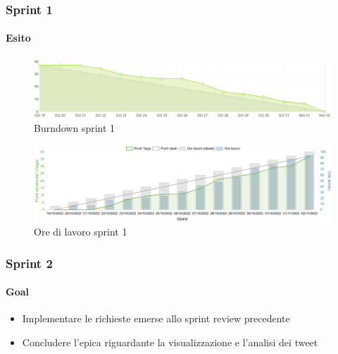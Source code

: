 \documentclass{beamer}
\begin{document}

\begin{frame}
  \frametitle{Sprint 1}
  \framesubtitle{Esito}
  \begin{figure}[H]
      \centering
      \includegraphics[width=\textwidth]{../img/sprint1/burndown.png}    
      \caption{Burndown sprint 1}
  \end{figure}
  \begin{figure}[H]
    \centering
    \includegraphics[width=\textwidth]{../img/sprint1/worktime.png}    
    \caption{Ore di lavoro sprint 1}
\end{figure}
\end{frame}


\begin{frame}
  \frametitle{Sprint 2}
  \framesubtitle{Goal}

  \begin{itemize}
    \item Implementare le richieste emerse allo sprint review precedente
    \item Concludere l'epica riguardante la visualizzazione e l'analisi dei tweet
  \end{itemize}
\end{frame}

\end{document}
